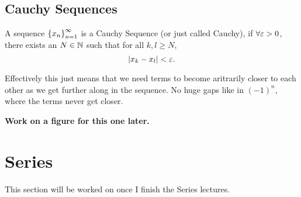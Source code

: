 \documentclass[12pt]{article}
\theoremstyle{definition}
\newcommand{\xn}{\set{x_{n}}_{n = 1}^{\infty}}
\begin{document}
    \subsection{Cauchy Sequences}
    \begin{definition}
        A sequence $\xn$ is a Cauchy Sequence (or just called Cauchy), if $\forall \varepsilon > 0$, there exists an $N \in \mathbb{N}$ such that for all $k, l \geq N$,
        \begin{equation*}
            \left|x_{k} - x_{l}\right| < \varepsilon.
        \end{equation*} 
    \end{definition}
    \begin{remark}
        Effectively this just means that we need terms to become aritrarily closer to each other as we get further along in the sequence. No huge gaps like in $(-1)^{n}$, where the terms never get closer.
    \end{remark}
    \textbf{Work on a figure for this one later.}

    \section{Series}
    This section will be worked on once I finish the Series lectures. 
\end{document}
